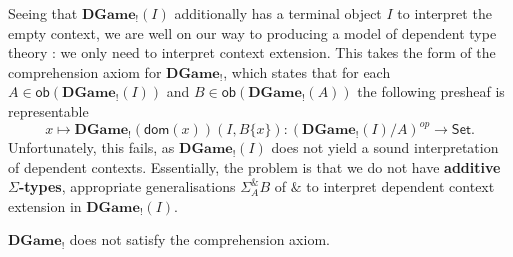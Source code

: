 \documentclass[runningheads,a4paper]{llncs}
\newcommand{\ra}[1]{\stackrel{#1}{\longrightarrow}}
\newcommand{\Gamecat}{\mathbf{Game}}
\newcommand{\DGame}{\mathbf{DGame}}
\newcommand{\str}{\mathsf{str}}
\newcommand{\wstr}{\mathsf{wstr}}
\renewcommand{\emph}[1]{\textbf{#1}}
\newcommand{\Osat}[0]{\textnormal{\textsf{O}-\textsf{sat}}}
\newcommand{\ob}[0]{\mathsf{ob}}
\begin{document}


Seeing that $\DGame_!(I)$ additionally has a terminal object $I$ to interpret the empty context, we are well on our way to producing a  model of dependent type theory \cite{vakar2015syntax}: we only need to interpret context extension. This takes the form of the comprehension axiom for $\DGame_!$, which states that for each $A\in\mathsf{ob}(\DGame_!(I))$ and $B\in\mathsf{ob}(\DGame_!(A))$ the following presheaf is representable\vspace{-2pt} $$x\mapsto\DGame_!(\mathsf{dom}(x))(I,B\{x\}):(\DGame_!(I)/A)^{op}\ra{}\mathsf{Set}.$$ 
Unfortunately, this fails, as $\DGame_!(I)$ does not yield a sound interpretation of dependent contexts. Essentially, the problem is that we do not have \emph{additive $\Sigma$-types}, appropriate generalisations $\Sigma_A^\& B$ of $\&$ to interpret dependent context extension in $\DGame_!(I)$.
\begin{theorem}$\DGame_!$ does not satisfy the comprehension axiom.
\end{theorem}
\end{document}
